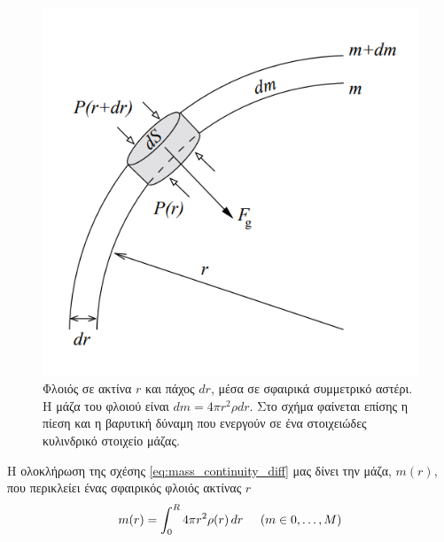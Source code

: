 \begin{figure}
    \centering
    \includegraphics[scale=0.4]{Figures/spherical_shell_mechanical_equilibrium.png}
    \caption{Φλοιός σε ακτίνα $r$ και πάχος $dr$, μέσα σε σφαιρικά συμμετρικό αστέρι. Η μάζα του φλοιού είναι $dm = 4\pi r^2 \rho dr$. Στο σχήμα φαίνεται επίσης η πίεση και η βαρυτική δύναμη που ενεργούν σε ένα στοιχειώδες κυλινδρικό στοιχείο μάζας.}
    \label{fig:spherical_shell_hydrostatic_equilibrium}
\end{figure}

Η ολοκλήρωση της σχέσης \eqref{eq:mass_continuity_diff} μας δίνει την μάζα, $m(r)$, που περικλείει ένας σφαιρικός φλοιός ακτίνας $r$
\begin{equation}
        \label{eq:mass_coordinate}
    m(r) = \int_{0}^{R} 4\pi r^2 \rho(r) \,dr \hspace{0.5cm} (m \in 0,\dots,M)
\end{equation}

